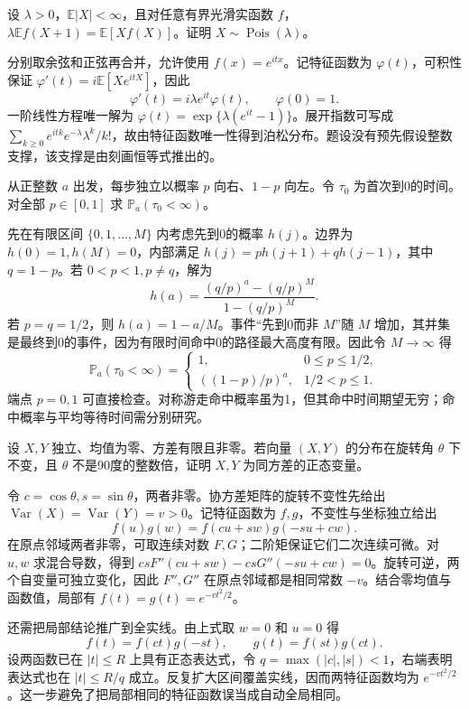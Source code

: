 \documentclass[UTF8,12pt,a4paper,fontset=fandol]{ctexbook}
\newcommand{\E}{\mathbb E}
\newcommand{\PP}{\mathbb P}
\DeclareMathOperator{\Var}{Var}
\begin{document}
\begin{example}[原题2：泊松分布的差分恒等式]\label{yau:2020-2}
设 $\lambda>0$，$\E|X|<\infty$，且对任意有界光滑实函数 $f$，$\lambda\E f(X+1)=\E[Xf(X)]$。证明 $X\sim\operatorname{Pois}(\lambda)$。
\end{example}
\begin{solve}
分别取余弦和正弦再合并，允许使用 $f(x)=e^{itx}$。记特征函数为 $\varphi(t)$，可积性保证 $\varphi'(t)=i\E[Xe^{itX}]$，因此
\[
\varphi'(t)=i\lambda e^{it}\varphi(t),\qquad \varphi(0)=1.
\]
一阶线性方程唯一解为 $\varphi(t)=\exp\{\lambda(e^{it}-1)\}$。展开指数可写成 $\sum_{k\ge0}e^{itk}e^{-\lambda}\lambda^k/k!$，故由特征函数唯一性得到泊松分布。题设没有预先假设整数支撑，该支撑是由刻画恒等式推出的。
\end{solve}

\begin{example}[原题3：偏置随机游走命中零点]\label{yau:2020-3}
从正整数 $a$ 出发，每步独立以概率 $p$ 向右、$1-p$ 向左。令 $\tau_0$ 为首次到0的时间。对全部 $p\in[0,1]$ 求 $\PP_a(\tau_0<\infty)$。
\end{example}
\begin{solve}
先在有限区间 $\{0,1,\ldots,M\}$ 内考虑先到0的概率 $h(j)$。边界为 $h(0)=1,h(M)=0$，内部满足 $h(j)=ph(j+1)+qh(j-1)$，其中 $q=1-p$。若 $0<p<1,p\ne q$，解为
\[
h(a)=\frac{(q/p)^a-(q/p)^M}{1-(q/p)^M}.
\]
若 $p=q=1/2$，则 $h(a)=1-a/M$。事件“先到0而非 $M$”随 $M$ 增加，其并集是最终到0的事件，因为有限时间命中0的路径最大高度有限。因此令 $M\to\infty$ 得
\[
\PP_a(\tau_0<\infty)=\begin{cases}1,&0\le p\le1/2,\\((1-p)/p)^a,&1/2<p\le1.\end{cases}
\]
端点 $p=0,1$ 可直接检查。对称游走命中概率虽为1，但其命中时间期望无穷；命中概率与平均等待时间需分别研究。
\end{solve}

\begin{example}[原题4：独立坐标与旋转不变性的正态刻画]\label{yau:2020-4}
设 $X,Y$ 独立、均值为零、方差有限且非零。若向量 $(X,Y)$ 的分布在旋转角 $\theta$ 下不变，且 $\theta$ 不是90度的整数倍，证明 $X,Y$ 为同方差的正态变量。
\end{example}
\begin{solve}
令 $c=\cos\theta,s=\sin\theta$，两者非零。协方差矩阵的旋转不变性先给出 $\Var(X)=\Var(Y)=v>0$。记特征函数为 $f,g$，不变性与坐标独立给出
\[
f(u)g(w)=f(cu+sw)g(-su+cw).
\]
在原点邻域两者非零，可取连续对数 $F,G$；二阶矩保证它们二次连续可微。对 $u,w$ 求混合导数，得到 $csF''(cu+sw)-csG''(-su+cw)=0$。旋转可逆，两个自变量可独立变化，因此 $F'',G''$ 在原点邻域都是相同常数 $-v$。结合零均值与函数值，局部有 $f(t)=g(t)=e^{-vt^2/2}$。

还需把局部结论推广到全实线。由上式取 $w=0$ 和 $u=0$ 得
\[
f(t)=f(ct)g(-st),\qquad g(t)=f(st)g(ct).
\]
设两函数已在 $|t|\le R$ 上具有正态表达式，令 $q=\max(|c|,|s|)<1$，右端表明表达式也在 $|t|\le R/q$ 成立。反复扩大区间覆盖实线，因而两特征函数均为 $e^{-vt^2/2}$。这一步避免了把局部相同的特征函数误当成自动全局相同。
\end{solve}
\end{document}
